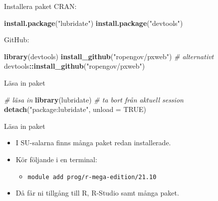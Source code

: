 \documentclass[
  11pt,
  ignorenonframetext,
]{beamer}
\newenvironment{Shaded}{\begin{snugshade}}{\end{snugshade}}
\newcommand{\AttributeTok}[1]{\textcolor[rgb]{0.13,0.29,0.53}{#1}}
\newcommand{\CommentTok}[1]{\textcolor[rgb]{0.56,0.35,0.01}{\textit{#1}}}
\newcommand{\ConstantTok}[1]{\textcolor[rgb]{0.56,0.35,0.01}{#1}}
\newcommand{\FunctionTok}[1]{\textcolor[rgb]{0.13,0.29,0.53}{\textbf{#1}}}
\newcommand{\NormalTok}[1]{#1}
\newcommand{\SpecialCharTok}[1]{\textcolor[rgb]{0.81,0.36,0.00}{\textbf{#1}}}
\newcommand{\StringTok}[1]{\textcolor[rgb]{0.31,0.60,0.02}{#1}}
\providecommand{\tightlist}{%
  \setlength{\itemsep}{0pt}\setlength{\parskip}{0pt}}
\begin{document}
\begin{frame}[fragile]{Installera paket}
\label{installera-paket}
CRAN:

\begin{Shaded}
\begin{Highlighting}[]
\FunctionTok{install.package}\NormalTok{(}\StringTok{"lubridate"}\NormalTok{)}
\FunctionTok{install.package}\NormalTok{(}\StringTok{"devtools"}\NormalTok{)}
\end{Highlighting}
\end{Shaded}

GitHub:

\begin{Shaded}
\begin{Highlighting}[]
\FunctionTok{library}\NormalTok{(devtools)}
\FunctionTok{install\_github}\NormalTok{(}\StringTok{"ropengov/pxweb"}\NormalTok{)}
\CommentTok{\# alternativt}
\NormalTok{devtools}\SpecialCharTok{::}\FunctionTok{install\_github}\NormalTok{(}\StringTok{"ropengov/pxweb"}\NormalTok{)}
\end{Highlighting}
\end{Shaded}
\end{frame}

\begin{frame}[fragile]{Läsa in paket}
\label{luxe4sa-in-paket}
\begin{Shaded}
\begin{Highlighting}[]
\CommentTok{\# läsa in}
\FunctionTok{library}\NormalTok{(lubridate)}
\CommentTok{\# ta bort från aktuell session}
\FunctionTok{detach}\NormalTok{(}\StringTok{"package:lubridate"}\NormalTok{, }\AttributeTok{unload =} \ConstantTok{TRUE}\NormalTok{)}
\end{Highlighting}
\end{Shaded}
\end{frame}

\begin{frame}{Läsa in paket}
\label{luxe4sa-in-paket-1}
\begin{itemize}
\tightlist
\item
  I SU-salarna finns många paket redan installerade.
\item
  Kör följande i en terminal:

  \begin{itemize}
  \tightlist
  \item
    \texttt{module add prog/r-mega-edition/21.10}
  \end{itemize}
\item
  Då får ni tillgång till R, R-Studio samt många paket.
\end{itemize}
\end{frame}
\end{document}
